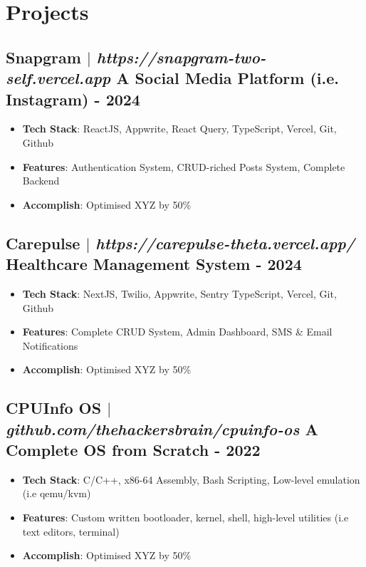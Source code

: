 \documentclass[11pt]{article} %
\begin{document}
\section{Projects}
\subsection{Snapgram $|$ \normalfont\textit{https://snapgram-two-self.vercel.app} \hfill A Social Media Platform (i.e. Instagram) - \textbf{2024}}
\vspace{3pt}
\begin{itemize}
  \item \textbf{Tech Stack}: ReactJS, Appwrite, React Query, TypeScript, Vercel, Git, Github
  \item \textbf{Features}: Authentication System, CRUD-riched Posts System, Complete Backend
  \item \textbf{Accomplish}: Optimised XYZ by 50\%
\end{itemize}

\subsection{Carepulse $|$ \normalfont\textit{https://carepulse-theta.vercel.app/} \hfill Healthcare Management System - \textbf{2024}}
\vspace{3pt}
\begin{itemize}
  \item \textbf{Tech Stack}: NextJS, Twilio, Appwrite, Sentry TypeScript, Vercel, Git, Github
  \item \textbf{Features}: Complete CRUD System, Admin Dashboard, SMS \& Email Notifications
  \item \textbf{Accomplish}: Optimised XYZ by 50\%
\end{itemize}

\subsection{CPUInfo OS $|$ \normalfont\textit{github.com/thehackersbrain/cpuinfo-os} \hfill A Complete OS from Scratch - \textbf{2022}}
\vspace{3pt}
\begin{itemize}
  \item \textbf{Tech Stack}: C/C++, x86-64 Assembly, Bash Scripting, Low-level emulation (i.e qemu/kvm)
  \item \textbf{Features}: Custom written bootloader, kernel, shell, high-level utilities (i.e text editors, terminal)
  \item \textbf{Accomplish}: Optimised XYZ by 50\%
\end{itemize}
\end{document}
